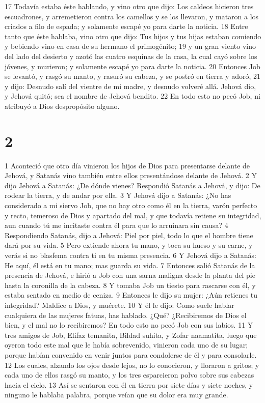 17 Todavía estaba éste hablando, y vino otro que dijo: Los caldeos hicieron tres escuadrones, y arremetieron contra los camellos y se los llevaron, y mataron a los criados a filo de espada; y solamente escapé yo para darte la noticia.
18 Entre tanto que éste hablaba, vino otro que dijo: Tus hijos y tus hijas estaban comiendo y bebiendo vino en casa de su hermano el primogénito;
19 y un gran viento vino del lado del desierto y azotó las cuatro esquinas de la casa, la cual cayó sobre los jóvenes, y murieron; y solamente escapé yo para darte la noticia.
20 Entonces Job se levantó, y rasgó su manto, y rasuró su cabeza, y se postró en tierra y adoró,
21 y dijo: Desnudo salí del vientre de mi madre, y desnudo volveré allá. Jehová dio, y Jehová quitó; sea el nombre de Jehová bendito.
22 En todo esto no pecó Job, ni atribuyó a Dios despropósito alguno.

\chapter{2}


1 Aconteció que otro día vinieron los hijos de Dios para presentarse delante de Jehová, y Satanás vino también entre ellos presentándose delante de Jehová.
2 Y dijo Jehová a Satanás: ¿De dónde vienes? Respondió Satanás a Jehová, y dijo: De rodear la tierra, y de andar por ella.
3 Y Jehová dijo a Satanás: ¿No has considerado a mi siervo Job, que no hay otro como él en la tierra, varón perfecto y recto, temeroso de Dios y apartado del mal, y que todavía retiene su integridad, aun cuando tú me incitaste contra él para que lo arruinara sin causa?
4 Respondiendo Satanás, dijo a Jehová: Piel por piel, todo lo que el hombre tiene dará por su vida.
5 Pero extiende ahora tu mano, y toca su hueso y su carne, y verás si no blasfema contra ti en tu misma presencia.
6 Y Jehová dijo a Satanás: He aquí, él está en tu mano; mas guarda su vida.
7 Entonces salió Satanás de la presencia de Jehová, e hirió a Job con una sarna maligna desde la planta del pie hasta la coronilla de la cabeza.
8 Y tomaba Job un tiesto para rascarse con él, y estaba sentado en medio de ceniza.
9 Entonces le dijo su mujer: ¿Aún retienes tu integridad? Maldice a Dios, y muérete.
10 Y él le dijo: Como suele hablar cualquiera de las mujeres fatuas, has hablado. ¿Qué? ¿Recibiremos de Dios el bien, y el mal no lo recibiremos? En todo esto no pecó Job con sus labios.
11 Y tres amigos de Job, Elifaz temanita, Bildad suhita, y Zofar naamatita, luego que oyeron todo este mal que le había sobrevenido, vinieron cada uno de su lugar; porque habían convenido en venir juntos para condolerse de él y para consolarle.
12 Los cuales, alzando los ojos desde lejos, no lo conocieron, y lloraron a gritos; y cada uno de ellos rasgó su manto, y los tres esparcieron polvo sobre sus cabezas hacia el cielo.
13 Así se sentaron con él en tierra por siete días y siete noches, y ninguno le hablaba palabra, porque veían que su dolor era muy grande.

